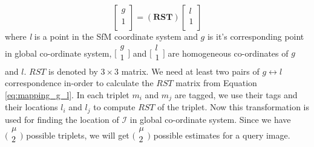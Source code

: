 \begin{equation}
\begin{bmatrix}
g\\
1\\
\end{bmatrix} = (\textbf{RST})
\begin{bmatrix}
l\\
1\\
\end{bmatrix}
\label{eq:mapping_g_l}
\end{equation}
where \textit{l} is a point in the SfM coordinate system and \textit{$g$} is it's corresponding point in global \gps co-ordinate system,
$\bigl[\begin{smallmatrix}
g\\ 1\\
\end{smallmatrix} \bigr]$
and 
$\bigl[\begin{smallmatrix}
l\\ 1\\
\end{smallmatrix} \bigr]$
are homogeneous co-ordinates of \textit{$g$} and \textit{$l$}. $RST$ is denoted by $3 \times 3$ matrix. 
We need at least two pairs of $g \leftrightarrow l$ correspondence in-order to calculate the $RST$ matrix from 
Equation \ref{eq:mapping_g_l}. In each triplet $m_i$ and $m_j$ are \gps tagged, we use their \gps tags 
and their locations $l_i$ and $l_j$ to compute $RST$ of the triplet. Now this transformation is used for finding the 
location of $\mathcal{I}$ in global \gps co-ordinate system. %
Since we have $\bigl(\begin{smallmatrix} \mu \\ 2\\ \end{smallmatrix} \bigr)$ possible triplets, we
  will get $\bigl(\begin{smallmatrix} \mu \\ 2\\ \end{smallmatrix} \bigr)$ possible \gps estimates for a query image.

